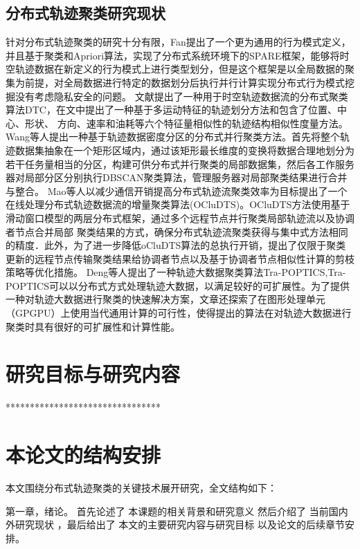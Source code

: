 \subsection{分布式轨迹聚类研究现状}
针对分布式轨迹聚类的研究十分有限，Fan提出了一个更为通用的行为模式定义，并且基于聚类和Apriori算法，实现了分布式系统环境下的SPARE框架，能够将时空轨迹数据在新定义的行为模式上进行类型划分，但是这个框架是以全局数据的聚集为前提，对全局数据进行特定的数据划分后执行并行计算实现分布式行为模式挖掘没有考虑隐私安全的问题。
文献\cite{肖源分布式车辆时空轨迹异常检测算法研究}提出了一种用于时空轨迹数据流的分布式聚类算法DTC，在文中提出了一种基于多运动特征的轨迹划分方法和包含了位置、中心、形状、
方向、速率和油耗等六个特征量相似性的轨迹结构相似性度量方法。
Wang等人提出一种基于轨迹数据密度分区的分布式并行聚类方法。首先将整个轨迹数据集抽象在一个矩形区域内，通过该矩形最长维度的变换将数据合理地划分为若干任务量相当的分区，构建可供分布式并行聚类的局部数据集，然后各工作服务器对局部分区分别执行DBSCAN聚类算法，管理服务器对局部聚类结果进行合并与整合。
Mao等人以减少通信开销提高分布式轨迹流聚类效率为目标提出了一个在线处理分布式轨迹数据流的增量聚类算法(OCluDTS)。OCluDTS方法使用基于滑动窗口模型的两层分布式框架，通过多个远程节点并行聚类局部轨迹流以及协调者节点合并局部
聚类结果的方式，确保分布式轨迹流聚类获得与集中式方法相同的精度．此外，为了进一步降低oCluDTS算法的总执行开销，提出了仅限于聚类更新的远程节点传输聚类结果给协调者节点以及基于协调者节点相似性计算的剪枝策略等优化措施。
Deng等人提出了一种轨迹大数据聚类算法Tra-POPTICS,Tra-POPTICS可以以分布式方式处理轨迹大数据，以满足较好的可扩展性。为了提供一种对轨迹大数据进行聚类的快速解决方案，文章还探索了在图形处理单元（GPGPU）上使用当代通用计算的可行性，使得提出的算法在对轨迹大数据进行聚类时具有很好的可扩展性和计算性能。


\section{研究目标与研究内容}

********************************

\section{本论文的结构安排}
本文围绕分布式轨迹聚类的关键技术展开研究，全文结构如下：

第一章，绪论。 首先论述了 本课题的相关背景和研究意义 然后介绍了 当前国内外研究现状 ，最后给出了 本文的主要研究内容与研究目标 以及论文的后续章节安排。

